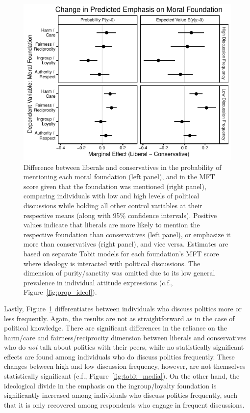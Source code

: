 \documentclass[12pt]{article}
\begin{document}
\begin{figure}[ht]\centering
\includegraphics{../calc/fig/tobit_ideol_disc.pdf}
\caption{Difference between liberals and conservatives in the probability of mentioning each moral foundation (left panel), and in the MFT score given that the foundation was mentioned (right panel), comparing individuals with low and high levels of political discussions while holding all other control variables at their respective means (along with 95\% confidence intervals). Positive values indicate that liberals are more likely to mention the respective foundation than conservatives (left panel), or emphasize it more than conservatives (right panel), and vice versa. Estimates are based on separate Tobit models for each foundation's MFT score where ideology is interacted with political discussions. The dimension of purity/sanctity was omitted due to its low general prevalence in individual attitude expressions (c.f., Figure~\ref{fig:prop_ideol}).}\label{fig:tobit_ideol_disc}
\end{figure}

Lastly, Figure~\ref{fig:tobit_ideol_disc} differentiates between individuals who discuss politics more or less frequently. Again, the results are not as straightforward as in the case of political knowledge. There are significant differences in the reliance on the harm/care and fairness/reciprocity dimension between liberals and conservatives who do \textit{not} talk about politics with their peers, while no statistically significant effects are found among individuals who do discuss politics frequently. These changes between high and low discussion frequency, however, are not themselves statistically significant (c.f., Figure~\ref{fig:tobit_media}). On the other hand, the ideological divide in the emphasis on the ingroup/loyalty foundation is significantly increased among individuals who discuss politics frequently, such that it is only recovered among respondents who engage in frequent discussions.
\end{document}
